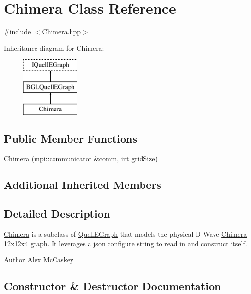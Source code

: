 \hypertarget{a00027}{}\section{Chimera Class Reference}
\label{a00027}


{\ttfamily \#include $<$Chimera.\+hpp$>$}

Inheritance diagram for Chimera\+:\begin{figure}[H]
\begin{center}
\leavevmode
\includegraphics[height=3.000000cm]{a00027}
\end{center}
\end{figure}
\subsection*{Public Member Functions}
\begin{DoxyCompactItemize}
\item 
\hyperlink{a00027_a7cfe2760d4af1eb7c16f02799cdeb3a6}{Chimera} (mpi\+::communicator \&comm, int grid\+Size)
\end{DoxyCompactItemize}
\subsection*{Additional Inherited Members}


\subsection{Detailed Description}
\hyperlink{a00027}{Chimera} is a subclass of \hyperlink{a00100}{Quell\+E\+Graph} that models the physical D-\/\+Wave \hyperlink{a00027}{Chimera} 12x12x4 graph. It leverages a json configure string to read in and construct itself.

\begin{DoxyAuthor}{Author}
Alex Mc\+Caskey 
\end{DoxyAuthor}


\subsection{Constructor \& Destructor Documentation}
